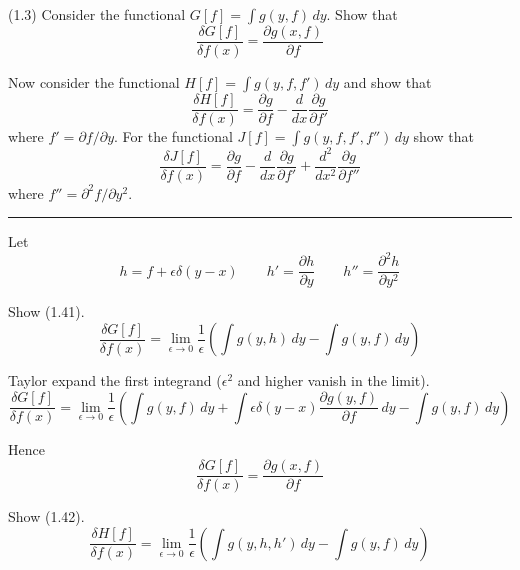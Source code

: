 \documentclass[12pt]{article}
\begin{document}
(1.3)
Consider the functional $G[f]=\int g(y,f)\,dy$.
Show that
\begin{equation*}
\frac{\delta G[f]}{\delta f(x)}=\frac{\partial g(x,f)}{\partial f}
\tag{1.41}
\end{equation*}

Now consider the functional $H[f]=\int g(y,f,f')\,dy$
and show that
\begin{equation*}
\frac{\delta H[f]}{\delta f(x)}=\frac{\partial g}{\partial f}
-\frac{d}{dx}\frac{\partial g}{\partial f'}
\tag{1.42}
\end{equation*}
where $f'=\partial f/\partial y$.
For the functional $J[f]=\int g(y,f,f',f'')\,dy$ show that
\begin{equation*}
\frac{\delta J[f]}{\delta f(x)}
=\frac{\partial g}{\partial f}
-\frac{d}{dx}\frac{\partial g}{\partial f'}
+\frac{d^2}{dx^2}\frac{\partial g}{\partial f''}
\tag{1.43}
\end{equation*}
where $f''=\partial^2 f/\partial y^2$.

\bigskip
\hrule

\bigskip
Let
\begin{equation*}
h=f+\epsilon\delta(y-x)
\qquad
h'=\frac{\partial h}{\partial y}
\qquad
h''=\frac{\partial^2 h}{\partial y^2}
\end{equation*}

Show (1.41).
\begin{equation*}
\frac{\delta G[f]}{\delta f(x)}
=\lim_{\epsilon\rightarrow 0}\frac{1}{\epsilon}
\left(
\int g(y,h)\,dy-\int g(y,f)\,dy
\right)
\end{equation*}

Taylor expand the first integrand ($\epsilon^2$ and higher vanish in the limit).
\begin{equation*}
\frac{\delta G[f]}{\delta f(x)}
=\lim_{\epsilon\rightarrow 0}\frac{1}{\epsilon}
\left(
\int g(y,f)\,dy
+\int\epsilon\delta(y-x)\frac{\partial g(y,f)}{\partial f}\,dy
-\int g(y,f)\,dy
\right)
\end{equation*}

Hence
\begin{equation*}
\frac{\delta G[f]}{\delta f(x)}=\frac{\partial g(x,f)}{\partial f}
\end{equation*}

Show (1.42).
\begin{equation*}
\frac{\delta H[f]}{\delta f(x)}
=\lim_{\epsilon\rightarrow 0}\frac{1}{\epsilon}
\left(
\int g(y,h,h')\,dy-\int g(y,f)\,dy
\right)
\end{equation*}
\end{document}
